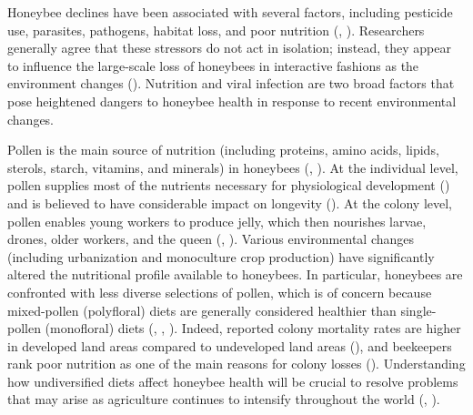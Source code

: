 \documentclass[11pt,a4paper,oldfontcommands,openany]{memoir}
\numberwithin{equation}{section} %
\begin{document}
Honeybee declines have been associated with several factors, including pesticide use, parasites, pathogens, habitat loss, and poor nutrition (\citealt{factors}, \citealt{factors2}). Researchers generally agree that these stressors do not act in isolation; instead, they appear to influence the large-scale loss of honeybees in interactive fashions as the environment changes (\citealt{interacting}). Nutrition and viral infection are two broad factors that pose heightened dangers to honeybee health in response to recent environmental changes.

Pollen is the main source of nutrition (including proteins, amino acids, lipids, sterols, starch, vitamins, and minerals) in honeybees (\citealt{source}, \citealt{source2}). At the individual level, pollen supplies most of the nutrients necessary for physiological development (\citealt{brodschneider}) and is believed to have considerable impact on longevity (\citealt{longevity}). At the colony level, pollen enables young workers to produce jelly, which then nourishes larvae, drones, older workers, and the queen (\citealt{jelly}, \citealt{jelly2}). Various environmental changes (including urbanization and monoculture crop production) have significantly altered the nutritional profile available to honeybees. In particular, honeybees are confronted with less diverse selections of pollen, which is of concern because mixed-pollen (polyfloral) diets are generally considered healthier than single-pollen (monofloral) diets (\citealt{diverse}, \citealt{diverse2}, \citealt{alaux}). Indeed, reported colony mortality rates are higher in developed land areas compared to undeveloped land areas (\citealt{undeveloped}), and beekeepers rank poor nutrition as one of the main reasons for colony losses (\citealt{bkLoss}). Understanding how undiversified diets affect honeybee health will be crucial to resolve problems that may arise as agriculture continues to intensify throughout the world (\citealt{ag}, \citealt{ag2}).
\end{document}
